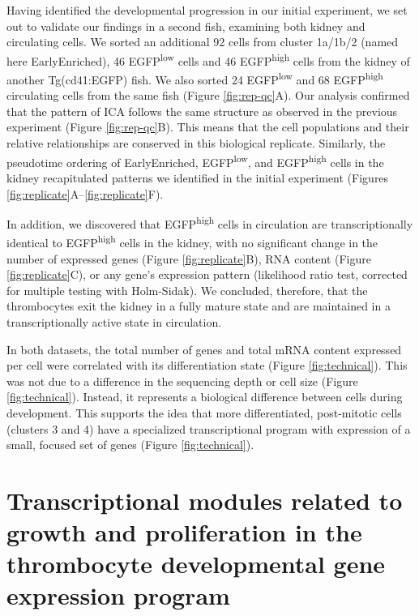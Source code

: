 Having identified the developmental progression in our initial experiment, we set out to validate our findings in a second fish, examining both kidney and circulating cells. We sorted an additional 92 cells from cluster 1a/1b/2 (named here EarlyEnriched), 46 EGFP\textsuperscript{low} cells and 46 EGFP\textsuperscript{high} cells from the kidney of another Tg(cd41:EGFP) fish. We also sorted 24 EGFP\textsuperscript{low} and 68 EGFP\textsuperscript{high} circulating cells from the same fish (Figure \ref{fig:rep-qc}A). Our analysis confirmed that the pattern of ICA follows the same structure as observed in the previous experiment (Figure \ref{fig:rep-qc}B). This means that the cell populations and their relative relationships are conserved in this biological replicate. Similarly, the pseudotime ordering of EarlyEnriched, EGFP\textsuperscript{low}, and EGFP\textsuperscript{high} cells in the kidney recapitulated patterns we identified in the initial experiment (Figures \ref{fig:replicate}A–\ref{fig:replicate}F).

In addition, we discovered that EGFP\textsuperscript{high} cells in circulation are transcriptionally identical to EGFP\textsuperscript{high} cells in the kidney, with no significant change in the number of expressed genes (Figure \ref{fig:replicate}B), RNA content (Figure \ref{fig:replicate}C), or any gene’s expression pattern (likelihood ratio test, corrected for multiple testing with Holm-Sidak). We concluded, therefore, that the thrombocytes exit the kidney in a fully mature state and are maintained in a transcriptionally active state in circulation.

In both datasets, the total number of genes and total mRNA content expressed per cell were correlated with its differentiation state (Figure \ref{fig:technical}). This was not due to a difference in the sequencing depth or cell size (Figure \ref{fig:technical}). Instead, it represents a biological difference between cells during development. This supports the idea that more differentiated, post-mitotic cells (clusters 3 and 4) have a specialized transcriptional program with expression of a small, focused set of genes (Figure \ref{fig:technical}).

\section{Transcriptional modules related to growth and proliferation in the thrombocyte developmental gene expression program}

